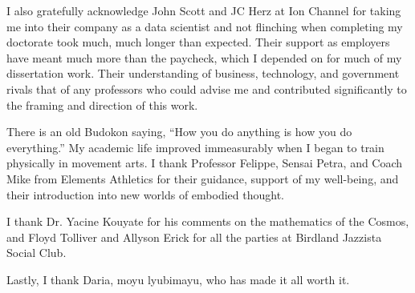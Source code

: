 \documentclass[../thesis.tex]{subfiles}
\begin{document}
 I also gratefully acknowledge John Scott and JC Herz
 at Ion Channel
 for taking me into their company as a data scientist and
 not flinching when completing my doctorate took much,
 much longer than expected.
 Their support as employers have meant much more than the paycheck,
 which I depended on for much of my dissertation work.
 Their understanding of business, technology, and government
 rivals that of any professors who could advise me
 and contributed significantly to the framing and direction
 of this work.

 There is an old Budokon saying, ``How you do anything
 is how you do everything.''
 My academic life improved immeasurably when I began
 to train physically in movement arts.
 I thank Professor Felippe, Sensai Petra, and Coach Mike
 from Elements Athletics for their guidance,
 support of my well-being, and their introduction
 into new worlds of embodied thought.

 I thank Dr. Yacine Kouyate for his comments on
 the mathematics of the Cosmos, and Floyd Tolliver
 and Allyson Erick for all the parties at
 Birdland Jazzista Social Club.
 
 Lastly, I thank Daria, moyu lyubimayu, who has
 made it all worth it.
\end{document}
